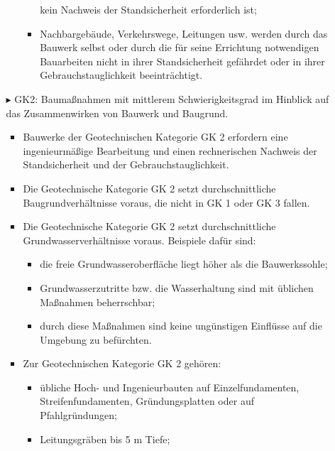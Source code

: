 \documentclass[fleqn,twoside]{article}
\begin{document}
\begin{itemize}
\begin{itemize}
\begin{itemize}
\begin{itemize}
                            kein Nachweis der Standsicherheit erforderlich ist;
                            \item Nachbargebäude, Verkehrswege, Leitungen usw. werden durch das Bauwerk selbst oder durch die für
                            seine Errichtung notwendigen Bauarbeiten nicht in ihrer Standsicherheit gefährdet oder in ihrer                Gebrauchstauglichkeit beeinträchtigt.
                        \end{itemize}
                    \end{itemize}
                $\blacktriangleright$ GK2: Baumaßnahmen mit mittlerem Schwierigkeitsgrad im Hinblick auf das Zusammenwirken von Bauwerk und Baugrund.
                    \begin{itemize}
                        \item Bauwerke der Geotechnischen Kategorie GK 2 erfordern eine ingenieurmäßige Bearbeitung und
                einen rechnerischen Nachweis der Standsicherheit und der Gebrauchstauglichkeit.
                        \item Die Geotechnische Kategorie GK 2 setzt durchschnittliche Baugrundverhältnisse voraus, die nicht in
                GK 1 oder GK 3 fallen.
                        \item Die Geotechnische Kategorie GK 2 setzt durchschnittliche Grundwasserverhältnisse voraus.
                Beispiele dafür sind:
                            \begin{itemize}
                                \item die freie Grundwasseroberfläche liegt höher als die Bauwerkssohle;
                                \item Grundwasserzutritte bzw. die Wasserhaltung sind mit üblichen Maßnahmen beherrschbar;
                                \item durch diese Maßnahmen sind keine ungünstigen Einflüsse auf die Umgebung zu befürchten.
                            \end{itemize}
                        \item Zur Geotechnischen Kategorie GK 2 gehören:
                            \begin{itemize}
                                \item übliche Hoch- und Ingenieurbauten auf Einzelfundamenten, Streifenfundamenten, Gründungsplatten                 oder auf Pfahlgründungen;
                                \item Leitungsgräben bis 5 m Tiefe;

\end{itemize}
\end{itemize}
\end{itemize}
\end{itemize}
\end{document}
